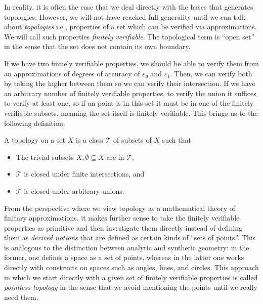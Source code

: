 In reality, it is often the case that we deal directly with the bases that generates
topologies. However, we will not have reached full generality until we can talk about
\emph{topologies} i.e., properties of a set which can be verified via approximations.
We will call such properties \emph{finitely verifiable}. The topological term is ``open
set'' in the sense that the set does not contain its own boundary.

If we have two finitely verifiable properties, we should be able to verify them from an
approximations of degrees of accuracy of $ε₀$ and $ε₁$. Then, we can verify both by taking
the higher between them so we can verify their intersection. If we have an arbitrary
number of finitely verifiable properties, to verify the union it suffices to verify at
least one, so if an point is in this set it must be in one of the finitely verifiable
subsets, meaning the set itself is finitely verifiable. This brings us to the following
definition:
\begin{defn}
  A topology on a set $X$ is a class $\mathcal{T}$ of subsets of $X$ such that
  \begin{itemize}
    \item The trivial subsets $X, \emptyset \subseteq X$ are in $\mathcal{T}$,
    \item $\mathcal{T}$ is closed under finite intersections, and
    \item $\mathcal{T}$ is closed under arbitrary unions.
  \end{itemize}
\end{defn}

From the perspective where we view topology as a mathematical theory of finitary
approximations, it makes further sense to take the finitely verifiable properties as
primitive and then investigate them directly instead of defining them as \emph{derived
notions} that are defined as certain kinds of ``sets of points''. This is analogous to
the distinction between analytic and synthetic geometry: in the former, one defines a
space as a set of points, whereas in the latter one works directly with constructs on
spaces such as angles, lines, and circles. This approach in which we start directly with
a given set of finitely verifiable properties is called \emph{pointless topology} in the
sense that we avoid mentioning the points until we really need them.

